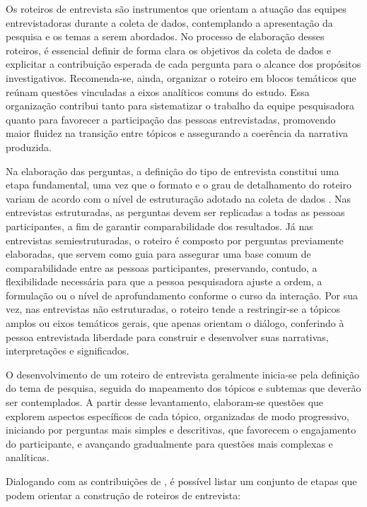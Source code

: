 \documentclass[12pt, a4paper, openany]{book}
\begin{document}
Os roteiros de entrevista s\~ao instrumentos que orientam a atua\c{c}\~ao das equipes entrevistadoras durante a coleta de dados, contemplando a apresenta\c{c}\~ao da pesquisa e os temas a serem abordados. No processo de elabora\c{c}\~ao desses roteiros, \'e essencial definir de forma clara os objetivos da coleta de dados e explicitar a contribui\c{c}\~ao esperada de cada pergunta para o alcance dos prop\'ositos investigativos. Recomenda-se, ainda, organizar o roteiro em blocos tem\'aticos que re\'unam quest\~oes vinculadas a eixos anal\'iticos comuns do estudo. Essa organiza\c{c}\~ao contribui tanto para sistematizar o trabalho da equipe pesquisadora quanto para favorecer a participa\c{c}\~ao das pessoas entrevistadas, promovendo maior fluidez na transi\c{c}\~ao entre t\'opicos e assegurando a coer\^encia da narrativa produzida.

Na elabora\c{c}\~ao das perguntas, a defini\c{c}\~ao do tipo de entrevista constitui uma etapa fundamental, uma vez que o formato e o grau de detalhamento do roteiro variam de acordo com o n\'ivel de estrutura\c{c}\~ao adotado na coleta de dados \citep{wilson2012research}. Nas entrevistas estruturadas, as perguntas devem ser replicadas a todas as pessoas participantes, a fim de garantir comparabilidade dos resultados. J\'a nas entrevistas semiestruturadas, o roteiro \'e composto por perguntas previamente elaboradas, que servem como guia para assegurar uma base comum de comparabilidade entre as pessoas participantes, preservando, contudo, a flexibilidade necess\'aria para que a pessoa pesquisadora ajuste a ordem, a formula\c{c}\~ao ou o n\'ivel de aprofundamento conforme o curso da intera\c{c}\~ao. Por sua vez, nas entrevistas n\~ao estruturadas, o roteiro tende a restringir-se a t\'opicos amplos ou eixos tem\'aticos gerais, que apenas orientam o di\'alogo, conferindo \`a pessoa entrevistada liberdade para construir e desenvolver suas narrativas, interpreta\c{c}\~oes e significados.

O desenvolvimento de um roteiro de entrevista geralmente inicia-se pela defini\c{c}\~ao do tema de pesquisa, seguida do mapeamento dos t\'opicos e subtemas que dever\~ao ser contemplados. A partir desse levantamento, elaboram-se quest\~oes que explorem aspectos espec\'ificos de cada t\'opico, organizadas de modo progressivo, iniciando por perguntas mais simples e descritivas, que favorecem o engajamento do participante, e avan\c{c}ando gradualmente para quest\~oes mais complexas e anal\'iticas.

Dialogando com as contribui\c{c}\~oes de \citet{eppich2019in}, \'e poss\'ivel listar um conjunto de etapas que podem orientar a constru\c{c}\~ao de roteiros de entrevista:
\end{document}
